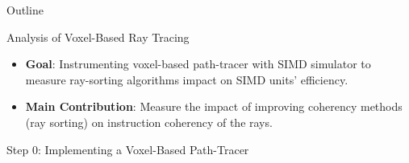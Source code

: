 \documentclass{beamer}
\begin{document}
\begin{frame}{Outline}
\end{frame}

\begin{frame}{Analysis of Voxel-Based Ray Tracing}
	\begin{itemize}
		\item \textbf{Goal}: Instrumenting voxel-based path-tracer with SIMD simulator to measure ray-sorting algorithms impact on SIMD units' efficiency.
		\item  \textbf{Main Contribution}: Measure the impact of improving coherency methods (ray sorting) on instruction coherency of the rays.
	\end{itemize}
\end{frame}

\begin{frame}{Step 0: Implementing a Voxel-Based Path-Tracer}
	\begin{figure}
		\centering
	\end{figure}
\end{frame}
\end{document}
